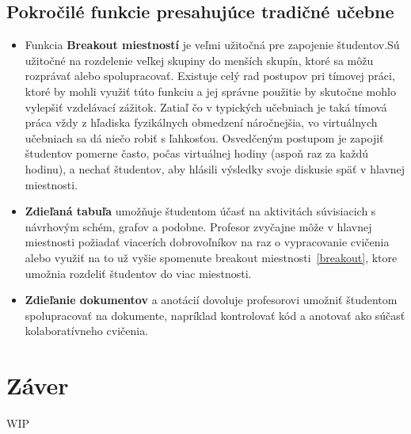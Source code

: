 \documentclass[10pt,twoside,slovak,a4paper]{article}
\begin{document}
\subsection{Pokročilé funkcie presahujúce tradičné učebne} \label{Pokr}
\begin{itemize}
	\item Funkcia \textbf{Breakout miestností} je veľmi užitočná pre zapojenie študentov.\cite{VCf}Sú užitočné na rozdelenie veľkej 
	skupiny do menších skupín, ktoré sa môžu rozprávať alebo spolupracovať. Existuje celý rad postupov 
	pri tímovej práci, ktoré by mohli využiť túto funkciu a jej správne použitie by skutočne mohlo vylepšiť 
	vzdelávací zážitok. Zatiaľ čo v typických učebniach je taká tímová práca vždy z hľadiska fyzikálnych obmedzení náročnejšia,
	vo virtuálnych učebniach sa dá niečo robiť s ľahkosťou. Osvedčeným postupom je zapojiť študentov pomerne často, počas virtuálnej hodiny (aspoň raz za každú hodinu),
	a nechať študentov, aby hlásili výsledky svoje diskusie späť v hlavnej miestnosti. \label{breakout}

	\item \textbf{Zdieľaná tabuľa} umožňuje študentom účasť na aktivitách súvisiacich s návrhovým schém,
	grafov a podobne. Profesor zvyčajne môže v hlavnej miestnosti požiadať viacerích dobrovoľníkov na raz o vypracovanie cvičenia
	alebo využiť na to už vyšie spomenute breakout miestnosti~\ref{breakout}, ktore umožnia rozdeliť študentov do viac miestnosti.

	\item \textbf{Zdieľanie dokumentov} a anotácií dovoluje profesorovi umožniť študentom spolupracovať na dokumente,
	napríklad kontrolovať kód a anotovať ako súčasť kolaboratívneho cvičenia.
	
\end{itemize}	




\section{Záver} \label{zaver} %
WIP





\end{document}
